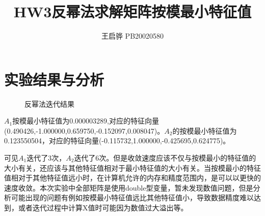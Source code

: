 \documentclass{article}
\title{\songti \zihao{2}\bfseries HW3反幂法求解矩阵按模最小特征值}
\author{王启骅 PB20020580}
\begin{document}
	\maketitle
	\section{实验结果与分析}
	\begin{figure}[!h]
		\centering
		\caption{\heiti{}反幂法迭代结果}
		
	\end{figure}


$A_1$按模最小特征值为0.000003289,对应的特征向量(0.490426,-1.000000,0.659750,-0.152097,0.008047)。$ A_2 $的按模最小特征值为0.123550504，对应的特征向量(-0.115732,1.000000,-0.425695,0.624775)。


可见$ A_1 $迭代了3次，$ A_2 $迭代了6次。但是收敛速度应该不仅与按模最小的特征值的大小有关，还应该与其他特征值相对于最小特征值的大小有关。当按模最小的特征值相对于其他特征值远小时，在计算机允许的内存和精度范围内，是可以以更快的速度收敛。本次实验中全部矩阵是使用double型变量，暂未发现数值问题，但是分析可能出现的问题有例如按模最小特征值远比其他特征值小，导致数据精度难以达到，或者迭代过程中计算X值时可能因为数值过大溢出等。
\end{document}
